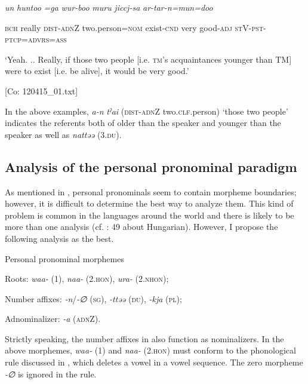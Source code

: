     \textit{un}  \textit{huntoo}  \textit{}  \textit{=ga}  \textit{wur-boo}  \textit{muru} \textit{jiccj-sa}  \textit{ar-tar-n=mun=doo}
                                                                                                  
    \textsc{bch}  really  \textsc{dist}-\textsc{adn}Z  two.person=\textsc{nom}  exist-\textsc{cnd}  very   good-\textsc{adj}  \textsc{st}V-\textsc{pst}-\textsc{ptcp}=\textsc{advrs}=\textsc{ass}

    ‘Yeah. .. Really, if those two people [i.e. \textsc{tm}’s acquaintances younger than TM] were to exist [i.e. be alive], it would be very good.’

    [Co: 120415\_01.txt]
\z
\z

In the above examples, \textit{a-n} \textit{tˀai} (\textsc{dist}-\textsc{adn}Z two.\textsc{clf}.person) ‘those two people’ indicates the referents both of older than the speaker and younger than the speaker as well as \textit{nattəə} (3.\textsc{du}).

\subsection{Analysis of the personal pronominal paradigm}

As mentioned in , personal pronominals seem to contain morpheme boundaries; however, it is difficult to determine the best way to analyze them. This kind of problem is common in the languages around the world and there is likely to be more than one analysis (cf. \citealt{Comrie1989}: 49 about Hungarian). However, I propose the following analysis as the best.

\ea \label{ex:5:14}  Personal pronominal morphemes

Roots:      \textit{waa-} (1), \textit{naa-} (2.\textsc{hon}), \textit{ura-} (2.\textsc{nhon});

Number affixes:  \textit{{}-n}/\textit{{}-∅} (\textsc{sg}), \textit{{}-ttəə} (\textsc{du}), \textit{{}-kja} (\textsc{pl});

Adnominalizer:  \textit{{}-a} (\textsc{adn}Z).
\z

Strictly speaking, the number affixes in  also function as nominalizers. In the above morphemes, \textit{waa-} (1) and \textit{naa-} (2.\textsc{hon}) must conform to the phonological rule discussed in , which deletes a vowel in a vowel sequence. The zero morpheme \textit{{}-∅} is ignored in the rule.

